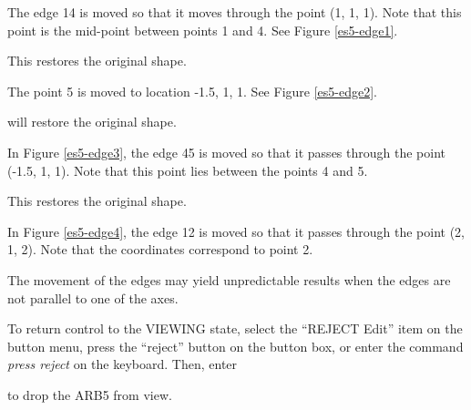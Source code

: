 The edge 14 is moved so that it moves through the point (1, 1, 1).
Note that this point is the mid-point between points 1 and 4.
See Figure \ref{es5-edge1}.


This restores the original shape.


The point 5 is moved to location -1.5, 1, 1.  See Figure \ref{es5-edge2}.


will restore the original shape.


In Figure \ref{es5-edge3}, the edge 45 is moved
so that it passes through the point (-1.5, 1, 1).
Note that this point lies between the points 4 and 5.


This restores the original shape.


In Figure \ref{es5-edge4},
the edge 12 is moved so that it passes through the point (2, 1, 2).
Note that the coordinates correspond to point 2.

The movement of the edges may yield unpredictable results when the edges 
are not parallel to one of the axes.


To return control to the VIEWING state, select the ``REJECT Edit''
item on the button menu, press the ``reject'' button on the button box,
or enter the command {\em press reject} on the keyboard.
Then, enter


to drop the ARB5 from view.

